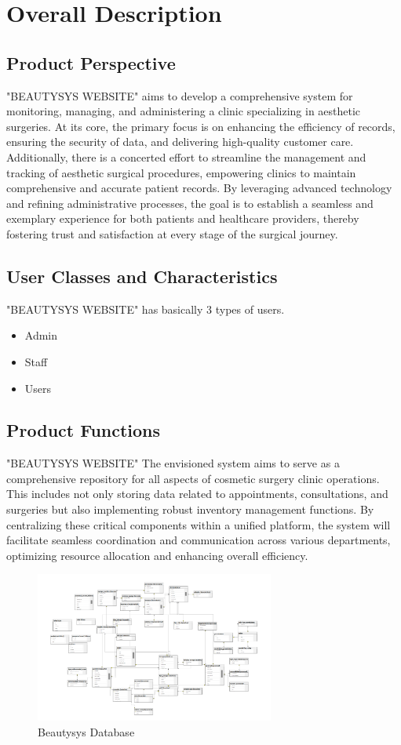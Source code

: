\documentclass{scrreprt}
\begin{document}
\chapter{Overall Description}

\section{Product Perspective}
"BEAUTYSYS WEBSITE" aims to develop a comprehensive system for monitoring, managing, and administering a clinic specializing in aesthetic surgeries. At its core, the primary focus is on enhancing the efficiency of records, ensuring the security of data, and delivering high-quality customer care. Additionally, there is a concerted effort to streamline the management and tracking of aesthetic surgical procedures, empowering clinics to maintain comprehensive and accurate patient records. By leveraging advanced technology and refining administrative processes, the goal is to establish a seamless and exemplary experience for both patients and healthcare providers, thereby fostering trust and satisfaction at every stage of the surgical journey.

\section{User Classes and Characteristics}
"BEAUTYSYS WEBSITE" has basically 3 types of users. 
\begin{itemize}
  \item Admin
  \item Staff
  \item Users
\end{itemize}

\section{Product Functions}
"BEAUTYSYS WEBSITE" The envisioned system aims to serve as a comprehensive repository for all aspects of cosmetic surgery clinic operations. This includes not only storing data related to appointments, consultations, and surgeries but also implementing robust inventory management functions. By centralizing these critical components within a unified platform, the system will facilitate seamless coordination and communication across various departments, optimizing resource allocation and enhancing overall efficiency.

\begin{figure}[H]
    \centering
    \includegraphics[width=0.7\textwidth]{img/data_base.png}
    \caption{Beautysys Database}
\end{figure}
\end{document}
